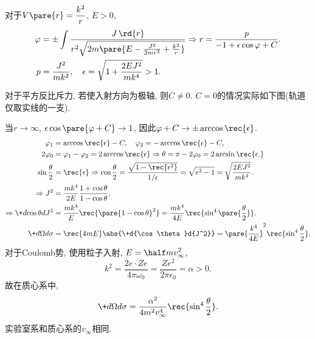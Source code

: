 \documentclass[../LectureNotes.tex]{subfiles}
\begin{document}
对于$\displaystyle V\pare{r} = \frac{k^2}{r}$, $E>0$,
\begin{align*}
    \varphi &= \pm \int \frac{J\,\rd{r}}{r^2\sqrt{2m\pare{E - \frac{J^2}{2mr^2} + \frac{k^2}{r}}}} \Rightarrow r = \frac{p}{-1 + \epsilon \cos\varphi + C}.\\
    p &= \frac{J^2}{mk^2},\quad \epsilon = \sqrt{1+\frac{2EJ^2}{mk^4}} > 1.
\end{align*}
\begin{remark}
    对于平方反比斥力, 若使入射方向为极轴, 则$C\neq 0$. $C=0$的情况实际如下图(轨道仅取实线的一支). 
    \begin{center}
    \end{center}
\end{remark}

当$r\rightarrow\infty$, $\epsilon\cos\pare{\varphi+C}\rightarrow 1$, 因此$\varphi+C \rightarrow \pm\displaystyle \arccos \rec{\epsilon}$.
\begin{align*}
    \varphi_1 &= \arccos \rec{\epsilon} - C,\quad \varphi_2 = -\arccos \rec{\epsilon} - C, \\
    2\varphi_0 &= \varphi_1 - \varphi_2 = 2\arccos \rec{\epsilon}\Rightarrow \theta = \pi - 2\varphi_0 = 2 \arcsin \rec{\epsilon.} \\
    \sin \frac{\theta}{2} &= \rec{\epsilon} \Rightarrow \cos \frac{\theta}{2} = \frac{\sqrt{1-\rec{\epsilon^2}}}{1/\epsilon} = \sqrt{\epsilon^2 - 1} = \sqrt{\frac{2EJ^2}{mk^4}}.\\
    \Rightarrow J^2 &= \frac{mk^4}{2E} \frac{1+\cos\theta}{1-\cos\theta}, \\
    \Rightarrow \+d{\cos\theta}d{J^2} &= \frac{mk^4}{E}\rec{\pare{1-\cos\theta}^2} = \frac{mk^4}{4E} \rec{\sin^4\pare{\frac{\theta}{2}}}. \\
    \+d\Omega d\sigma &= \rec{4mE}\abs{\+d{\cos\theta}d{J^2}} = \pare{\frac{k^4}{4E}}^2 \rec{\sin^4 \frac{\theta}{2}}.
\end{align*}
对于Coulomb势, 使用粒子入射, $\displaystyle E = \half mv_\infty^2$,
\[ k^2 = \frac{2e\cdot Ze}{4\pi\omega_0} = \frac{Ze^2}{2\pi \epsilon_0} = \alpha > 0. \]
故在质心系中,
\[ \+d\Omega d\sigma = \frac{\alpha^2}{4m^2v_\infty^4} \rec{\sin^4 \frac{\theta}{2}}. \]
实验室系和质心系的$v_\infty$相同.
\end{document}
